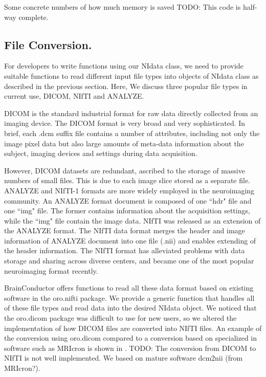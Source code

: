 \documentclass{nature}
\begin{document}
{\color{red}Some concrete numbers of how much memory is saved}
{\color{red}TODO: This code is half-way complete.}

\subsection{File Conversion.}
For developers to write functions using our NIdata class, we need to provide
suitable functions to read different input file types into objects of NIdata
class as described in the previous section. Here, We discuss three popular file
types in current use, DICOM, NIfTI and ANALYZE.

DICOM is the standard industrial
format for raw data directly collected from an imaging device. The DICOM format
is very broad and very sophisticated. In brief, each .dcm suffix file contains a
number of attributes, including not only the image pixel data but also large
amounts of meta-data information about the subject, imaging devices and settings
during data acquisition.

However, DICOM datasets are redundant, ascribed to the storage of massive
numbers of small files. This is due to each image slice stored as a separate
file. ANALYZE and NIfTI-1 formats are more widely employed in the neuroimaging
community. An ANALYZE format document is composed of one ``hdr" file and one
``img" file. The former contains information about the acquisition settings,
while the ``img" file contain the image data. NIfTI was released as an extension
of the ANALYZE format. The NIfTI data format merges the header and image
information of ANALYZE document into one file (.nii) and enables extending of
the header information. The NIfTI format has alleviated problems with data
storage and sharing across diverse centers, and became one of the most popular
neuroimaging format recently.

BrainConductor offers functions to read all these data format
based on existing software in the oro.nifti package. We
provide a generic function that handles all of these file types and read data
into the desired NIdata object.
We noticed that the oro.dicom package was difficult to use for new users, so
we altered the implementation of how DICOM files are converted into NIfTI 
files. An example of the conversion using oro.dicom compared to a conversion
based on specialized in software such as MRIcron\cite{rorden2011mricro} is
shown in .
{\color{red} TODO: The conversion from DICOM to NIfTI is not well implemented.
We based on mature
software dcm2nii (from MRIcron?).}
\end{document}
